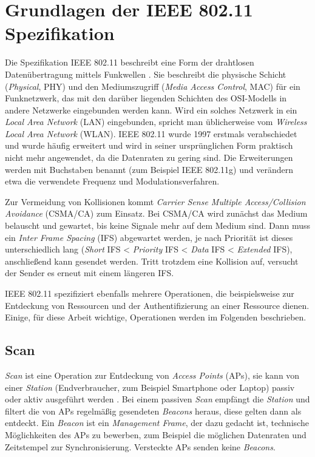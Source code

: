 \section{Grundlagen der IEEE 802.11 Spezifikation}
\label{ch:phase1:sec:grundlagen}
Die Spezifikation IEEE 802.11 beschreibt eine Form der drahtlosen Datenübertragung mittels Funkwellen \cite{ieee2012macphy}.
Sie beschreibt die physische Schicht (\emph{Physical}, PHY) und den Mediumszugriff (\emph{Media Access Control}, MAC) für ein Funknetzwerk, das mit den darüber liegenden Schichten des OSI-Modells in andere Netzwerke eingebunden werden kann.
Wird ein solches Netzwerk in ein \emph{Local Area Network} (LAN) eingebunden, spricht man üblicherweise vom \emph{Wireless Local Area Network} (WLAN).
IEEE 802.11 wurde 1997 erstmals verabschiedet und wurde häufig erweitert und wird in seiner ursprünglichen Form praktisch nicht mehr angewendet, da die Datenraten zu gering sind.
Die Erweiterungen werden mit Buchstaben benannt (zum Beispiel IEEE 802.11g) und verändern etwa die verwendete Frequenz und Modulationsverfahren.

Zur Vermeidung von Kollisionen kommt \emph{Carrier Sense Multiple Access/Collision Avoidance} (CSMA/CA) zum Einsatz.
Bei CSMA/CA wird zunächst das Medium belauscht und gewartet, bis keine Signale mehr auf dem Medium sind.
Dann muss ein \emph{Inter Frame Spacing} (IFS) abgewartet werden, je nach Priorität ist dieses unterschiedlich lang (\emph{Short} IFS < \emph{Priority} IFS < \emph{Data} IFS < \emph{Extended} IFS), anschließend kann gesendet werden.
Tritt trotzdem eine Kollision auf, versucht der Sender es erneut mit einem längeren IFS.

IEEE 802.11 spezifiziert ebenfalls mehrere Operationen, die beispielsweise zur Entdeckung von Ressourcen und der Authentifizierung an einer Ressource dienen.
Einige, für diese Arbeit wichtige, Operationen werden im Folgenden beschrieben.

\subsection{Scan}
\label{ch:phase1:sec:scan}
\emph{Scan} ist eine Operation zur Entdeckung von \emph{Access Points} (APs), sie kann von einer \emph{Station} (Endverbraucher, zum Beispiel Smartphone oder Laptop) passiv oder aktiv ausgeführt werden \cite{ieee2012scan}.
Bei einem passiven \emph{Scan} empfängt die \emph{Station} und filtert die von APs regelmäßig gesendeten \emph{Beacons} heraus, diese gelten dann als entdeckt.
Ein \emph{Beacon} ist ein \emph{Management Frame}, der dazu gedacht ist, technische Möglichkeiten des APs zu bewerben, zum Beispiel die möglichen Datenraten und Zeitstempel zur Synchronisierung.
Versteckte APs senden keine \emph{Beacons}.

